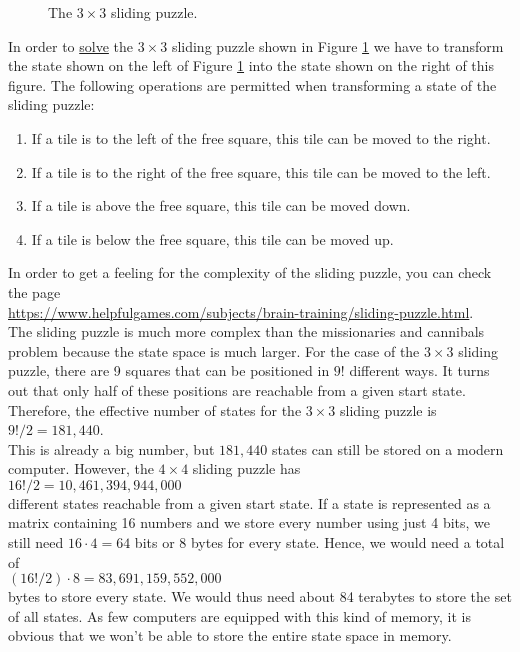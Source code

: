 \begin{figure}[!ht]
\centering
{}
\caption{The $3 \times 3$ sliding puzzle.}
\label{fig:8-puzzle.pdf}
\end{figure}

In order to \href{http://www.artbylogic.com/puzzles/numSlider/numberShuffle.htm?rows=3&cols=3&sqr=1}{solve} the $3 \times 3$
sliding puzzle shown in Figure \ref{fig:8-puzzle.pdf} we have to transform the state shown on the left of
Figure \ref{fig:8-puzzle.pdf} into the state shown on the right of this figure.  The following operations are permitted
when transforming a state of the sliding puzzle:
\begin{enumerate}
\item If a tile is to the left  of the free square, this tile can be moved to the right.
\item If a tile is to the right of the free square, this tile can be moved to the left.
\item If a tile is above           the free square, this tile can be moved down.
\item If a tile is below           the free square, this tile can be moved up.
\end{enumerate}
In order to get a feeling for the complexity of the sliding puzzle, you can check the page
\\[0.2cm]
\hspace*{1.3cm}
\href{https://www.helpfulgames.com/subjects/brain-training/sliding-puzzle.html}{https://www.helpfulgames.com/subjects/brain-training/sliding-puzzle.html}.
\\[0.2cm]
The sliding puzzle is much more complex than the missionaries and cannibals problem because the
state space is much larger.  For the case of the $3 \times 3$ sliding puzzle, there are 9 squares
that can be positioned in $9!$ different ways.  It turns out that only half of these positions are
reachable from a given start state.  Therefore, the effective number of states for the $3 \times 3$
sliding puzzle is
\\[0.2cm]
\hspace*{1.3cm}
$9! / 2 = 181,440$.
\\[0.2cm]
This is already a big number, but $181,440$ states can still be stored on a modern computer.  However, the
$4 \times 4$ sliding puzzle has
\\[0.2cm]
\hspace*{1.3cm}
$16!/2 = 10,461,394,944,000$
\\[0.2cm]
different states reachable from a given start state.  If a state is represented as a matrix containing
16 numbers and we store every number using just 4 bits, we still need $16 \cdot 4 = 64$ bits or 8
bytes for every state.  Hence, we would need a total of
\\[0.2cm]
\hspace*{1.3cm}
$(16! / 2) \cdot 8 = 83,691,159,552,000$
\\[0.2cm]
bytes to store every state. We would thus need about 84 terabytes to store the set of all states.  As few
computers are equipped with this kind of memory, it is obvious that we won't be able to store the
entire state space in memory.


